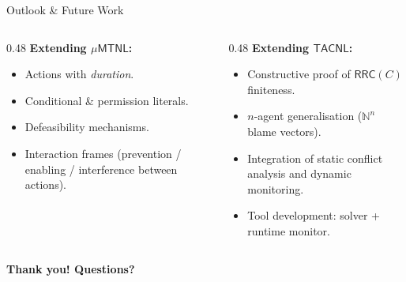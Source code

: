 \documentclass[9pt,aspectratio=169]{beamer}
\newcommand{\logic}[1]{\ensuremath{\mathsf{#1}}\xspace}
\newcommand{\TDDLfm}{\logic{\mu MTNL}}
\newcommand{\cDL}{\logic{TACNL}}
\newcommand{\rrcs}[1]{\ensuremath{\mathsf{RRC}\!\left(#1\right)}\xspace}
\begin{document}
\begin{frame}{Outlook \& Future Work}
\begin{columns}[T]
\begin{column}{0.48\textwidth}
  \textbf{Extending $\TDDLfm$:}
  \begin{itemize}
    \item Actions with \emph{duration}.
    \item Conditional \& permission literals.
    \item Defeasibility mechanisms.
    \item Interaction frames (prevention / enabling / interference between actions).
  \end{itemize}
\end{column}
\begin{column}{0.48\textwidth}
  \textbf{Extending \cDL:}
  \begin{itemize}
    \item Constructive proof of $\rrcs{C}$ finiteness.
    \item $n$-agent generalisation ($\mathbb{N}^n$ blame vectors).
    \item Integration of static conflict analysis and dynamic monitoring.
    \item Tool development: solver + runtime monitor.
  \end{itemize}
\end{column}
\end{columns}

\vspace{5mm}
\centering
{}

\vspace{4mm}
{\Large\bfseries Thank you! \quad Questions?}
\end{frame}
\end{document}
